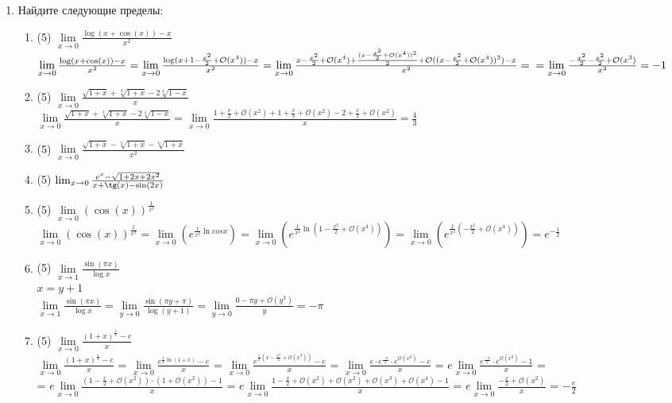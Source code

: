 \documentclass[a4paper]{article}
\begin{document}
\begin{enumerate}
    \item Найдите следующие пределы:
    \begin{enumerate}
        \item (5) $\lim\limits_{x\to 0}\frac{\log(x+\cos(x)) - x}{x^2}$\\
        $\lim\limits_{x\to 0}\frac{\log(x+\cos(x)) - x}{x^2} = \lim\limits_{x\to 0}\frac{\log(x + 1 - \frac{x^2}{2} + \mathcal O(x^4)) - x}{x^2} = 
        \lim\limits_{x\to 0}\frac{x - \frac{x^2}{2} + \mathcal O(x^4) + \frac{(x - \frac{x^2}{2} + \mathcal O(x^4))^2}{2} + \mathcal O((x - \frac{x^2}{2} + \mathcal O(x^4))^3) - x}{x^2} =\\= \lim\limits_{x\to 0}\frac{- \frac{x^2}{2} - \frac{x^2}{2} + \mathcal O(x^3)}{x^2} = -1$
        \item (5) $\lim\limits_{x\to 0}\frac{\sqrt{1+x} + \sqrt[3]{1+x} - 2\sqrt[4]{1-x}}{x}$\\
        $\lim\limits_{x\to 0}\frac{\sqrt{1+x} + \sqrt[3]{1+x} - 2\sqrt[4]{1-x}}{x} = \lim\limits_{x\to 0}\frac{1 + \frac{x}{2} + \mathcal O(x^2) + 1 + \frac{x}{3} + \mathcal O(x^2) - 2 + \frac{x}{2} + \mathcal O(x^2)}{x} = \frac{4}{3}$ 
        \item (5) $\lim\limits_{x\to 0}\frac{\sqrt{1+x} - \sqrt[3]{1+x} - \sqrt[6]{1+x}}{x^2}$
        \item (5) $\lim_{x\to 0}\frac{e^x - \sqrt{1 + 2x + 2x^2}}{x + \tg(x) - \sin (2x)}$
        \item (5) $\lim\limits_{x\to 0}(\cos(x))^{\frac{1}{x^2}}$\\
        $\lim\limits_{x\to 0}(\cos(x))^{\frac{1}{x^2}} = \lim\limits_{x\to 0}(e^{\frac{1}{x^2}\ln cosx}) = \lim\limits_{x\to 0}(e^{\frac{1}{x^2}\ln (1 - \frac{x^2}{2} + \mathcal O(x^4))}) = \lim\limits_{x\to 0}(e^{\frac{1}{x^2}(-\frac{x^2}{2} + \mathcal O(x^4))}) = e^{-\frac{1}{2}}$
        \item (5) $\lim\limits_{x\to 1}\frac{\sin(\pi x)}{\log x}$\\
        $x = y + 1$\\
        $\lim\limits_{x\to 1}\frac{\sin(\pi x)}{\log x} = \lim\limits_{y\to 0}\frac{\sin(\pi y + \pi)}{\log (y + 1)} = \lim\limits_{y\to 0} \frac{0 - \pi y + \mathcal O(y^3)}{y} = -\pi$
        \item (5) $\lim\limits_{x\to 0}\frac{(1 + x)^{\frac{1}{x}} - e}{x}$\\
        $\lim\limits_{x\to 0}\frac{(1 + x)^{\frac{1}{x}} - e}{x}$ = $\lim\limits_{x\to 0}\frac{e^{\frac{1}{x}\ln(1 + x)} - e}{x}$ = $\lim\limits_{x\to 0}\frac{e^{\frac{1}{x}(x - \frac{x^2}{2} + \mathcal O(x^3))} - e}{x}$ = $\lim\limits_{x\to 0}\frac{e\cdot e^\frac{-x}{2}\cdot e^{\mathcal O(x^2)} - e}{x}$ = $e\lim\limits_{x\to 0}\frac{e^\frac{-x}{2}\cdot e^{\mathcal O(x^2)} - 1}{x}$ =\\= $e\lim\limits_{x\to 0}\frac{(1 - \frac{x}{2} + \mathcal O(x^2))\cdot (1 + \mathcal O(x^2)) - 1}{x}$ = $e\lim\limits_{x\to 0}\frac{1 - \frac{x}{2} + \mathcal O(x^2) + \mathcal O(x^2) + \mathcal O(x^3) + \mathcal O(x^4) - 1}{x}$ = $e\lim\limits_{x\to 0}\frac{-\frac{x}{2} + \mathcal O(x^2)}{x}$ = $-\frac{e}{2}$

\end{enumerate}
\end{enumerate}
\end{document}

